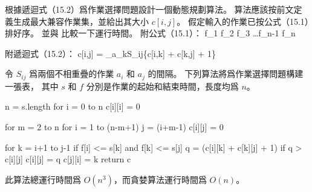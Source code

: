 \startEXERCISE
根據遞迴式（15.2）爲作業選擇問題設計一個動態規劃算法。
算法應該按前文定義生成最大兼容作業集，並給出其大小 $c[i,j]$。
假定輸入的作業已按公式（15.1）排好序。
並與  比較一下運行時間。
附公式（15.1）：
\startformula
f_1 \le f_2 \le f_3 \le \ldots \le f_{n-1} \le f_n
\stopformula

附遞迴式（15.2）：
\startformula
c[i,j] = \startcases
{} \NC {} \NR
\NC \max_{a_k\in S_{ij}}\{c[i,k] + c[k,j] + 1\}
   \NC {} \NR
\stopcases\stopformula
\stopEXERCISE

\startANSWER
令 $S_{ij}$ 爲兩個不相重疊的作業 $a_i$ 和 $a_j$ 的間隔。
下列算法將爲作業選擇問題構建一張表，
其中 $s$ 和 $f$ 分別是作業的起始和結束時間，長度均爲 $n$。

\startCLRSCODE
n = s.length
for i = 0 to n
	c[i][i] = 0

for m = 2 to n
	for i = 1 to (n-m+1)
		j = (i+m-1)
		c[i][j] = 0

		for k = i+1 to j-1
			if f[i] <= s[k] and f[k] <= s[j]
				q = (c[i][k] + c[k][j] + 1)
				if q > c[i][j]
					c[i][j] = q
					c[j][i] = k
return c
\stopCLRSCODE

此算法總運行時間爲 $O(n^3)$，而貪婪算法運行時間爲 $O(n)$。
\stopANSWER
